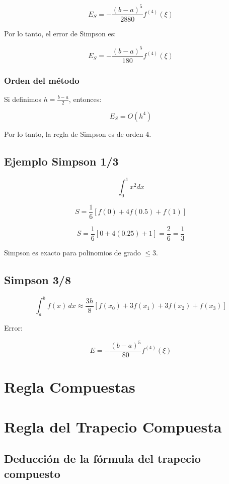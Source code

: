 \documentclass[12pt,a4paper]{article}
\begin{document}
\[
E_S = -\frac{(b-a)^5}{2880} f^{(4)}(\xi)
\]

Por lo tanto, el error de Simpson es:

\[
E_S = -\frac{(b-a)^5}{180} f^{(4)}(\xi)
\]

\subsubsection*{Orden del método}

Si definimos $h = \frac{b-a}{2}$, entonces:

\[
E_S = O(h^4)
\]

Por lo tanto, la regla de Simpson es de orden 4.

\subsection{Ejemplo Simpson 1/3}

\[
\int_0^1 x^2 dx
\]

\[
S = \frac{1}{6} [f(0) + 4f(0.5) + f(1)]
\]

\[
S = \frac{1}{6} [0 + 4(0.25) + 1] = \frac{2}{6} = \frac{1}{3}
\]

Simpson es exacto para polinomios de grado $\leq 3$.

\subsection{Simpson 3/8}

\[
\int_a^b f(x)\,dx \approx \frac{3h}{8} \left[f(x_0) + 3f(x_1) + 3f(x_2) + f(x_3)\right]
\]

Error:

\[
E = -\frac{(b-a)^5}{80} f^{(4)}(\xi)
\]

\newpage


\section{Regla Compuestas}

\section{Regla del Trapecio Compuesta}

\subsection{Deducción de la fórmula del trapecio compuesto}
\end{document}
